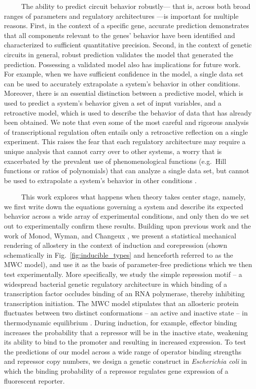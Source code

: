 \documentclass[12pt]{caltech_thesis}
\begin{document}
~~~~~The ability to predict circuit behavior robustly--- that is, across
both broad ranges of parameters and regulatory architectures ---is
important for multiple reasons. First, in the context of a specific
gene, accurate prediction demonstrates that all components relevant to
the genes' behavior have been identified and characterized to sufficient
quantitative precision. Second, in the context of genetic circuits in
general, robust prediction validates the model that generated the
prediction. Possessing a validated model also has implications for
future work. For example, when we have sufficient confidence in the
model, a single data set can be used to accurately extrapolate a
system's behavior in other conditions. Moreover, there is an essential
distinction between a predictive model, which is used to predict a
system's behavior given a set of input variables, and a retroactive
model, which is used to describe the behavior of data that has already
been obtained. We note that even some of the most careful and rigorous
analysis of transcriptional regulation often entails only a retroactive
reflection on a single experiment. This raises the fear that each
regulatory architecture may require a unique analysis that cannot carry
over to other systems, a worry that is exacerbated by the prevalent use
of phenomenological functions (e.g.~Hill functions or ratios of
polynomials) that can analyze a single data set, but cannot be used to
extrapolate a system's behavior in other conditions
\autocite{setty2003,poelwijk2011a,vilar2013,rogers2015,rohlhill2017}.

~~~~~This work explores what happens when theory takes center stage,
namely, we first write down the equations governing a system and
describe its expected behavior across a wide array of experimental
conditions, and only then do we set out to experimentally confirm these
results. Building upon previous work
\autocite{garcia2011,brewster2014,weinert2014} and the work of Monod,
Wyman, and Changeux \autocite{monod1965}, we present a statistical
mechanical rendering of allostery in the context of induction and
corepression (shown schematically in Fig.~\ref{fig:inducible_types} and
henceforth referred to as the MWC model), and use it as the basis of
parameter-free predictions which we then test experimentally. More
specifically, we study the simple repression motif -- a widespread
bacterial genetic regulatory architecture in which binding of a
transcription factor occludes binding of an RNA polymerase, thereby
inhibiting transcription initiation. The MWC model stipulates that an
allosteric protein fluctuates between two distinct conformations -- an
active and inactive state -- in thermodynamic equilibrium
\autocite{monod1965}. During induction, for example, effector binding
increases the probability that a repressor will be in the inactive
state, weakening its ability to bind to the promoter and resulting in
increased expression. To test the predictions of our model across a wide
range of operator binding strengths and repressor copy numbers, we
design a genetic construct in \emph{Escherichia coli} in which the
binding probability of a repressor regulates gene expression of a
fluorescent reporter.
\end{document}
